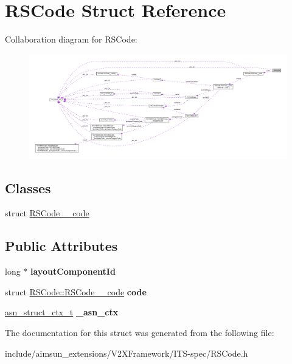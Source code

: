 \hypertarget{structRSCode}{}\section{R\+S\+Code Struct Reference}
\label{structRSCode}


Collaboration diagram for R\+S\+Code\+:\nopagebreak
\begin{figure}[H]
\begin{center}
\leavevmode
\includegraphics[width=350pt]{structRSCode__coll__graph}
\end{center}
\end{figure}
\subsection*{Classes}
\begin{DoxyCompactItemize}
\item 
struct \hyperlink{structRSCode_1_1RSCode____code}{R\+S\+Code\+\_\+\+\_\+code}
\end{DoxyCompactItemize}
\subsection*{Public Attributes}
\begin{DoxyCompactItemize}
\item 
long $\ast$ {\bfseries layout\+Component\+Id}\hypertarget{structRSCode_ad06a555926cf1c44a4c51646dc11f31e}{}\label{structRSCode_ad06a555926cf1c44a4c51646dc11f31e}

\item 
struct \hyperlink{structRSCode_1_1RSCode____code}{R\+S\+Code\+::\+R\+S\+Code\+\_\+\+\_\+code} {\bfseries code}\hypertarget{structRSCode_a713404300817602b74a5b5b89a08dc95}{}\label{structRSCode_a713404300817602b74a5b5b89a08dc95}

\item 
\hyperlink{structasn__struct__ctx__s}{asn\+\_\+struct\+\_\+ctx\+\_\+t} {\bfseries \+\_\+asn\+\_\+ctx}\hypertarget{structRSCode_a2d3c33e12caf92512ffac10465b9ae3c}{}\label{structRSCode_a2d3c33e12caf92512ffac10465b9ae3c}

\end{DoxyCompactItemize}


The documentation for this struct was generated from the following file\+:\begin{DoxyCompactItemize}
\item 
include/aimsun\+\_\+extensions/\+V2\+X\+Framework/\+I\+T\+S-\/spec/R\+S\+Code.\+h\end{DoxyCompactItemize}
